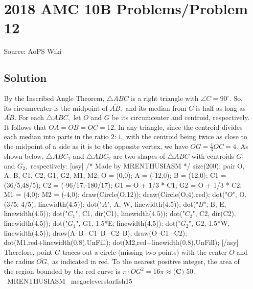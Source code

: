 \documentclass[12pt]{article}
\begin{document}
\section*{{2018 AMC 10B Problems/Problem 12}}
Source: AoPS Wiki

\subsection*{Solution}
By the Inscribed Angle Theorem, $\triangle ABC$ is a right triangle with $\angle C=90^{\circ}.$ So, its circumcenter is the midpoint of $\overline{AB},$ and its median from $C$ is half as long as $\overline{AB}.$ For each $\triangle ABC,$ let $O$ and $G$ be its circumcenter and centroid, respectively. It follows that $OA=OB=OC=12.$ In any triangle, since the centroid divides each median into parts in the ratio $2:1,$ with the centroid being twice as close to the midpoint of a side as it is to the opposite vertex, we have $OG=\frac13 OC=4.$ As shown below, $\triangle ABC_1$ and $\triangle ABC_2$ are two shapes of $\triangle ABC$ with centroids $G_1$ and $G_2,$ respectively: [asy] /* Made by MRENTHUSIASM */ size(200); pair O, A, B, C1, C2, G1, G2, M1, M2; O = (0,0); A = (-12,0); B = (12,0); C1 = (36/5,48/5); C2 = (-96/17,-180/17); G1 = O + 1/3 * C1; G2 = O + 1/3 * C2; M1 = (4,0); M2 = (-4,0); draw(Circle(O,12)); draw(Circle(O,4),red); dot("$O$", O, (3/5,-4/5), linewidth(4.5)); dot("$A$", A, W, linewidth(4.5)); dot("$B$", B, E, linewidth(4.5)); dot("$C_1$", C1, dir(C1), linewidth(4.5)); dot("$C_2$", C2, dir(C2), linewidth(4.5)); dot("$G_1$", G1, 1.5*E, linewidth(4.5)); dot("$G_2$", G2, 1.5*W, linewidth(4.5)); draw(A--B^^A--C1--B^^A--C2--B); draw(O--C1^^O--C2); dot(M1,red+linewidth(0.8),UnFill); dot(M2,red+linewidth(0.8),UnFill); [/asy] Therefore, point $G$ traces out a circle (missing two points) with the center $O$ and the radius $\overline{OG},$ as indicated in red. To the nearest positive integer, the area of the region bounded by the red curve is $\pi\cdot OG^2=16\pi\approx\boxed{\textbf{(C) } 50}.$ ~MRENTHUSIASM ~megacleverstarfish15
\end{document}
